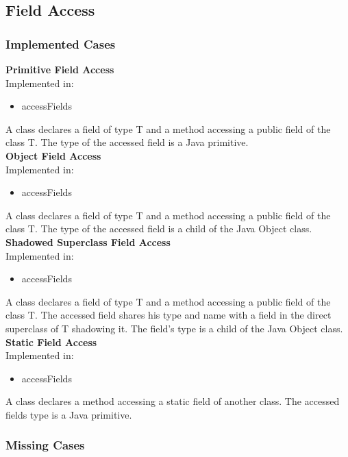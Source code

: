 \documentclass{article}
\begin{document}
\subsection{Field Access}
\subsubsection{Implemented Cases}

\textbf{Primitive Field Access}\\
Implemented in: 
\begin{itemize}
    \item accessFields
\end{itemize}
A class declares a field of type T and a method accessing a public field of the class T. The type of the accessed field is a Java primitive.\\

\noindent
\textbf{Object Field Access}\\
Implemented in: 
\begin{itemize}
    \item accessFields
\end{itemize}
A class declares a field of type T and a method accessing a public field of the class T. The type of the accessed field is a child of the Java Object class.\\

\noindent
\textbf{Shadowed Superclass Field Access}\\
Implemented in: 
\begin{itemize}
    \item accessFields
\end{itemize}
A class declares a field of type T and a method accessing a public field of the class T. The accessed field shares his type and name with a field in the direct superclass of T shadowing it. The field's type is a child of the Java Object class.\\

\noindent
\textbf{Static Field Access}\\
Implemented in: 
\begin{itemize}
    \item accessFields
\end{itemize}
A class declares a method accessing a static field of another class. The accessed fields type is a Java primitive.\\

\subsubsection{Missing Cases}
\end{document}
